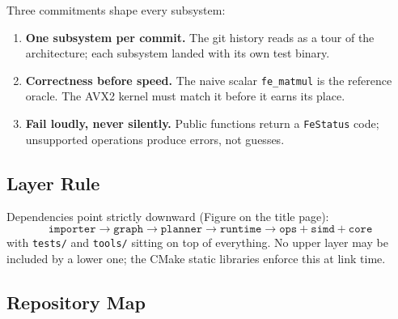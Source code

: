 \documentclass[11pt,a4paper]{article}
\begin{document}
Three commitments shape every subsystem:

\begin{enumerate}[itemsep=2pt]
\item \textbf{One subsystem per commit.} The git history reads as a tour of the
      architecture; each subsystem landed with its own test binary.
\item \textbf{Correctness before speed.} The naive scalar \texttt{fe\_matmul} is the
      reference oracle. The AVX2 kernel must match it before it earns its place.
\item \textbf{Fail loudly, never silently.} Public functions return a
      \texttt{FeStatus} code; unsupported operations produce errors, not guesses.
\end{enumerate}

\subsection{Layer Rule}

Dependencies point strictly downward (Figure on the title page):
\[
\texttt{importer} \rightarrow \texttt{graph} \rightarrow \texttt{planner}
\rightarrow \texttt{runtime} \rightarrow \texttt{ops} + \texttt{simd} +
\texttt{core}
\]
with \texttt{tests/} and \texttt{tools/} sitting on top of everything. No upper
layer may be included by a lower one; the CMake static libraries enforce this
at link time.

\subsection{Repository Map}
\end{document}
